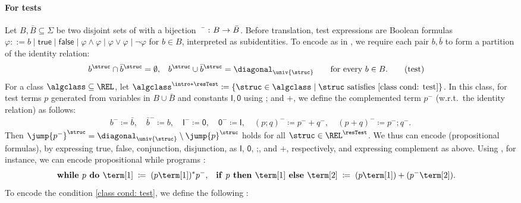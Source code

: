 \documentclass[10pt,a4paper]{article}
\theoremstyle{definition}
\theoremstyle{remark}
\DeclarePairedDelimiter\set{\{}{\}}
\newcommand{\const}[1]{\mathsf{#1}}
\newcommand{\defeq}{\coloneq}
\newcommand{\union}{\mathbin{+}}
\newcommand{\id}{\const{I}}
\newcommand{\emp}{\const{0}}
\newcommand{\compo}{\mathbin{;}}
\newcommand{\vsig}{\Sigma}
\begin{document}
\paragraph*{For tests}
Let $B, \bar{B} \subseteq \vsig$ be two disjoint sets of 
with a bijection $\bar{\mbox{\quad}} \colon B \to \bar{B}$.
Before translation, test expressions are Boolean formulas
$\varphi ::= b \mid \mathsf{true} \mid \mathsf{false} \mid
\varphi\land\varphi \mid \varphi\lor\varphi \mid \lnot\varphi$ for $b\in B$,
interpreted as subidentities.
To encode \intro*{} as in  \cite{kozenKleeneAlgebraTests1996},
we require each pair $b,\bar b$ to form a partition of the identity relation:
\begin{align*}
b^{\struc} \cap \bar b^{\struc} &= \emptyset,
& b^{\struc} \cup \bar b^{\struc} &= \diagonal_{\univ{\struc}}
\qquad\text{for every $b \in B$.} \tag{test}\label{class cond: test}
\end{align*}
\AP
For a class $\algclass \subseteq \REL$,
let $\algclass^{\intro*\resTest} \defeq \set{\struc \in \algclass \mid \text{$\struc$ satisfies \eqref{class cond: test}}}$.
In this class, for test terms $p$ generated from variables in $B \cup \bar{B}$ and constants $\id,\emp$ using $\compo$ and $\union$,
we define the complemented term $p^{-}$ (w.r.t.\  the identity relation) as follows:
\begin{gather*}
    b^{-} \defeq \bar{b}, \quad
    \bar{b}^{-} \defeq b, \quad
    \id^{-} \defeq \emp, \quad
    \emp^{-} \defeq \id, \quad
    (p \compo q)^{-} \defeq p^{-} \union q^{-}, \quad
    (p \union q)^{-} \defeq p^{-} \compo q^{-}.
\end{gather*}
Then $\jump{p^{-}}^{\struc} = \diagonal_{\univ{\struc}} \setminus \jump{p}^{\struc}$ holds for all $\struc \in \REL^{\resTest}$.
We thus can encode  (propositional formulas),
by expressing true, false, conjunction, disjunction,
as $\id$, $\emp$, $\compo$, and $\union$,
respectively,
and expressing complement as above.
Using , for instance, we can encode propositional while programs \cite{fischerPropositionalDynamicLogic1979,kozenKleeneAlgebraTests1997}:
\begin{align*}
    \mbox{\textbf{while }} p \mbox{\textbf{ do }} \term[1] &\;\defeq\; (p \term[1])^{*} p^{-}, &
    \mbox{\textbf{if }} p \mbox{\textbf{ then }} \term[1] \mbox{\textbf{ else }} \term[2] &\;\defeq\; (p \term[1]) \union (p^{-} \term[2]).
\end{align*}
To encode the condition \eqref{class cond: test}, we define the following :
\end{document}
